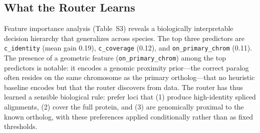 \subsection{What the Router Learns}

Feature importance analysis (Table~S3) reveals a biologically interpretable decision hierarchy that generalizes across species. The top three predictors are \texttt{c\_identity} (mean gain 0.19), \texttt{c\_coverage} (0.12), and \texttt{on\_primary\_chrom} (0.11). The presence of a geometric feature (\texttt{on\_primary\_chrom}) among the top predictors is notable: it encodes a genomic proximity prior---the correct paralog often resides on the same chromosome as the primary ortholog---that no heuristic baseline encodes but that the router discovers from data. The router has thus learned a sensible biological rule: prefer loci that (1) produce high-identity spliced alignments, (2) cover the full protein, and (3) are genomically proximal to the known ortholog, with these preferences applied conditionally rather than as fixed thresholds.
